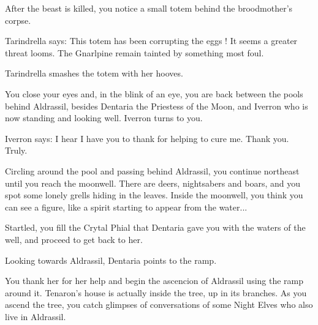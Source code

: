 After the beast is killed, you notice a small totem behind the broodmother's corpse.

Tarindrella says: This totem has been corrupting the eggs ! It seems a greater threat looms. The Gnarlpine remain tainted by something most foul.


Tarindrella smashes the totem with her hooves.


You close your eyes and, in the blink of an eye, you are back between the pools behind Aldrassil, besides Dentaria the Priestess of the Moon, and Iverron who is now standing and looking well. Iverron turns to you.


Iverron says: I hear I have you to thank for helping to cure me. Thank you. Truly.




Circling around the pool and passing behind Aldrassil, you continue northeast until you reach the moonwell. There are deers, nightsabers and boars, and you spot some lonely grells hiding in the leaves. Inside the moonwell, you think you can see a figure, like a spirit starting to appear from the water...


Startled, you fill the Crytal Phial that Dentaria gave you with the waters of the well, and proceed to get back to her.




Looking towards Aldrassil, Dentaria points to the ramp.


You thank her for her help and begin the ascencion of Aldrassil using the ramp around it. Tenaron's house is actually inside the tree, up in its branches. As you ascend the tree, you catch glimpses of conversations of some Night Elves who also live in Aldrassil.

